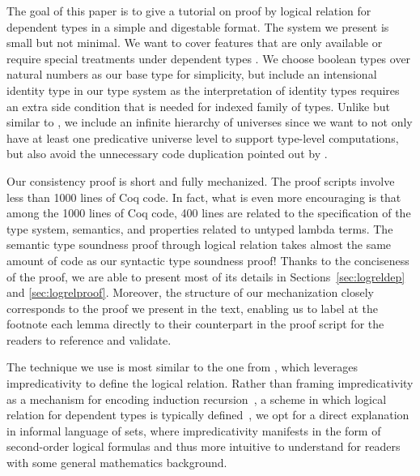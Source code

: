 \documentclass[acmsmall]{acmart}
\begin{document}
The goal of this paper is to give a tutorial on proof by logical relation for
dependent types in a simple and digestable format. %
The system we present is small but not minimal. We want to cover
features that are only available or require special treatments under
dependent types%
. We choose boolean
types over natural numbers as our base type for simplicity, but include an
intensional identity type in our type system as the interpretation
of identity types requires an extra side condition that is needed for
indexed family of types. Unlike \citet{nbeincoq,decagda,martin-lof-a-la-coq}
but similar to \citet{anand2014towards}, we include an infinite
hierarchy of universes since we want to not only have at least one
predicative universe level to support type-level computations, but
also avoid the unnecessary code duplication pointed out by
\citet{nbeincoq}.

Our consistency proof is short and fully mechanized. The proof scripts
involve less than 1000 lines of Coq code. In fact, what is even more
encouraging is that among the 1000
lines of Coq code, 400 lines are related to the specification of the
type system, semantics, and properties related to untyped lambda
terms. The semantic type soundness proof through logical relation
takes almost the same amount of code as our syntactic type soundness
proof!
Thanks to the conciseness of
the proof, we are able to present most of its details in
Sections~\ref{sec:logreldep} and \ref{sec:logrelproof}. Moreover, the
structure of our mechanization closely corresponds to the proof we
present in the text, enabling us to label at the footnote each lemma
directly to their counterpart in the proof script for the readers to
reference and validate.

The technique we use is most similar to the one from \citet{nbeincoq},
which leverages impredicativity to define the logical
relation. %
Rather than framing impredicativity as a
mechanism for encoding induction
recursion~\citep{induction-recursion}, a scheme in which logical
relation for dependent types is typically defined~\citep{todo}, we opt
for a direct explanation in informal language of sets, where
impredicativity manifests in the form of second-order logical
formulas and thus more intuitive to understand for readers with some
general mathematics background.
\end{document}
